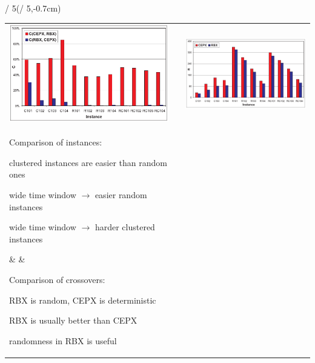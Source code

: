 \begin{textblock*}{ / 5}(\posterboxwidth / 5,-0.7cm)%
\centering%
\begin{tabular}{lll}
\includegraphics[height=\posterboxheight * 6/10]{vector/Comparison_C}&\hspace{2em}&%
\includegraphics[height=\posterboxheight * 6/10]{vector/Comparison_R}\\
\hspace{1em}\parbox[t]{\posterboxwidth / 4}{%
	Comparison of instances:
	\begin{mylist}
	\item clustered instances are easier than random ones
	\item wide time window $\rightarrow$ easier random instances
	\item wide time window $\rightarrow$ harder clustered instances
	\end{mylist}%
}& &%
\hspace{1em}\parbox[t]{\posterboxwidth / 4}{%
	Comparison of crossovers:
	\begin{mylist}
	\item RBX is random, CEPX is deterministic
	\item RBX is usually better than CEPX
	\item randomness in RBX is useful
	\end{mylist}%
}
\end{tabular}
\end{textblock*}
